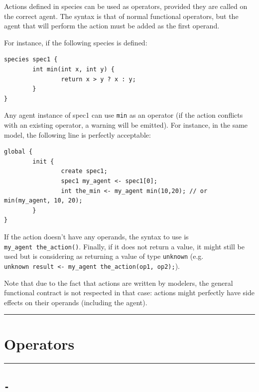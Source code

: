 \documentclass[]{book}
\theoremstyle{definition}
\theoremstyle{definition}
\theoremstyle{definition}
\theoremstyle{remark}
\begin{document}
Actions defined in species can be used as operators, provided they are
called on the correct agent. The syntax is that of normal functional
operators, but the agent that will perform the action must be added as
the first operand.

For instance, if the following species is defined:

\begin{verbatim}
species spec1 {
        int min(int x, int y) {
                return x > y ? x : y;
        }
}
\end{verbatim}

Any agent instance of spec1 can use \texttt{min} as an operator (if the
action conflicts with an existing operator, a warning will be emitted).
For instance, in the same model, the following line is perfectly
acceptable:

\begin{verbatim}
global {
        init {
                create spec1;
                spec1 my_agent <- spec1[0];
                int the_min <- my_agent min(10,20); // or min(my_agent, 10, 20);
        }
}
\end{verbatim}

If the action doesn't have any operands, the syntax to use is
\texttt{my\_agent\ the\_action()}. Finally, if it does not return a
value, it might still be used but is considering as returning a value of
type \texttt{unknown} (e.g.
\texttt{unknown\ result\ \textless{}-\ my\_agent\ the\_action(op1,\ op2);}).

Note that due to the fact that actions are written by modelers, the
general functional contract is not respected in that case: actions might
perfectly have side effects on their operands (including the agent).

\begin{center}\rule{0.5\linewidth}{\linethickness}\end{center}

\section{Operators}\label{operators}

\begin{center}\rule{0.5\linewidth}{\linethickness}\end{center}

\subsection{\texorpdfstring{\texttt{-}}{-}}\label{section}
\end{document}
